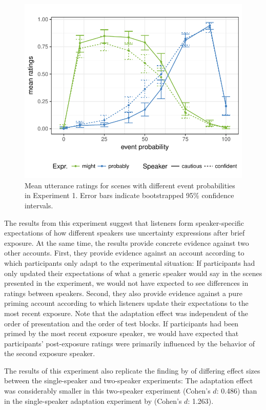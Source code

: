 \documentclass[10pt,letterpaper]{article}
\begin{document}
\begin{figure}
\includegraphics[width=\columnwidth]{plots/exp1-results.pdf}
\caption{Mean utterance ratings for scenes with different event probabilities in Experiment 1. Error bars indicate bootstrapped 95\% confidence intervals. \label{fig:exp1-results}}
\end{figure}

The results from this experiment suggest that listeners form speaker-specific expectations 
of how different speakers use uncertainty expressions after brief exposure. At the same time, the results provide
concrete evidence against two other accounts. First, they provide evidence against an account
according to which participants only adapt to the experimental situation: If participants had only updated 
their expectations of what a generic speaker would say in the scenes presented
in the experiment, we would not have expected to see differences in ratings between speakers. Second, they also 
provide evidence against a pure priming account according to which listeners update their expectations to the most 
recent exposure. Note that the adaptation effect was independent of the order of presentation 
and the order of test blocks. If participants had been primed by the most recent exposure speaker, we would have
expected that participants' post-exposure ratings were primarily influenced by the behavior of the second exposure speaker.


The results of this experiment also replicate the 
finding by  of differing effect sizes between the single-speaker and
two-speaker experiments: The adaptation effect
was considerably smaller in this two-speaker experiment (Cohen's $d$: 0.486) than in 
the single-speaker adaptation experiment by  (Cohen's $d$: 1.263). 
\end{document}
